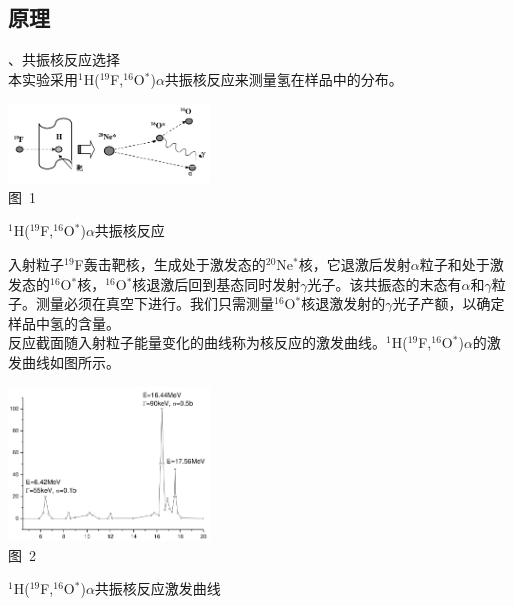 \documentclass[a4paper,10.0pt,twoside]{npr}
\begin{document}
\begin{multicols}{2}
\section{原理}
\vspace*{-1mm}
\song{}、共振核反应选择\\
本实验采用$^1$H($^{19}$F,$^{16}$O$^*$)$\alpha$共振核反应来测量氢在样品中的分布。
\begin{center}
\includegraphics[width=0.4\textwidth]{1.png}
\\
\xiaowu\song 图~1\begin{minipage}[t]{75mm} \quad $^1$H($^{19}$F,$^{16}$O$^*$)$\alpha$共振核反应\\[-1mm]\wuhao
\end{minipage}
\end{center}
入射粒子$^{19}$F轰击靶核，生成处于激发态的$^{20}$Ne$^*$核，它退激后发射$\alpha$粒子和处于激发态的$^{16}$O$^*$核，$^{16}$O$^*$核退激后回到基态同时发射$\gamma$光子。该共振态的末态有$\alpha$和$\gamma$粒子。测量必须在真空下进行。我们只需测量$^{16}$O$^*$核退激发射的$\gamma$光子产额，以确定样品中氢的含量。\\
反应截面随入射粒子能量变化的曲线称为核反应的激发曲线。$^1$H($^{19}$F,$^{16}$O$^*$)$\alpha$的激发曲线如图所示。
\begin{center}
\includegraphics[width=0.4\textwidth]{2.png}
\\
\xiaowu\song 图~2\begin{minipage}[t]{75mm} \quad $^1$H($^{19}$F,$^{16}$O$^*$)$\alpha$共振核反应激发曲线\\[-1mm]\wuhao
\end{minipage}
\end{center}

\end{multicols}
\end{document}
